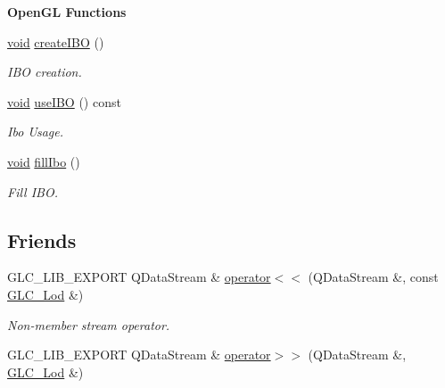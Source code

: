 \begin{Indent}{\bf Open\-G\-L Functions}\par
\begin{DoxyCompactItemize}
\item 
\hyperlink{group___u_a_v_objects_plugin_ga444cf2ff3f0ecbe028adce838d373f5c}{void} \hyperlink{class_g_l_c___lod_ac518f6a7580ddddd0820aecb9c189f9b}{create\-I\-B\-O} ()
\begin{DoxyCompactList}\small\item\em I\-B\-O creation. \end{DoxyCompactList}\item 
\hyperlink{group___u_a_v_objects_plugin_ga444cf2ff3f0ecbe028adce838d373f5c}{void} \hyperlink{class_g_l_c___lod_a930b9eb27ba9691774568ff4768a5bd3}{use\-I\-B\-O} () const 
\begin{DoxyCompactList}\small\item\em Ibo Usage. \end{DoxyCompactList}\item 
\hyperlink{group___u_a_v_objects_plugin_ga444cf2ff3f0ecbe028adce838d373f5c}{void} \hyperlink{class_g_l_c___lod_a21e324f89d570d25ba4844b8664adfe5}{fill\-Ibo} ()
\begin{DoxyCompactList}\small\item\em Fill I\-B\-O. \end{DoxyCompactList}\end{DoxyCompactItemize}
\end{Indent}
\subsection*{Friends}
\begin{DoxyCompactItemize}
\item 
G\-L\-C\-\_\-\-L\-I\-B\-\_\-\-E\-X\-P\-O\-R\-T Q\-Data\-Stream \& \hyperlink{class_g_l_c___lod_a57012b41553c8ff68e3453c0608dd960}{operator$<$$<$} (Q\-Data\-Stream \&, const \hyperlink{class_g_l_c___lod}{G\-L\-C\-\_\-\-Lod} \&)
\begin{DoxyCompactList}\small\item\em Non-\/member stream operator. \end{DoxyCompactList}\item 
G\-L\-C\-\_\-\-L\-I\-B\-\_\-\-E\-X\-P\-O\-R\-T Q\-Data\-Stream \& \hyperlink{class_g_l_c___lod_ab5da13a092240efc3a7c4df326c7ac5f}{operator$>$$>$} (Q\-Data\-Stream \&, \hyperlink{class_g_l_c___lod}{G\-L\-C\-\_\-\-Lod} \&)
\end{DoxyCompactItemize}
